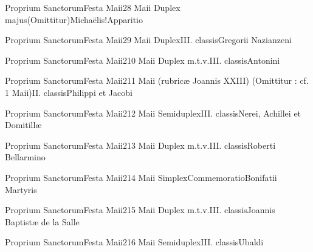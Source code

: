 \documentclass[liber-responsorialis_aestivus.tex]{subfiles}
\begin{document}
	{Proprium Sanctorum}{Festa Maii}{2}{8 Maii}
	{Duplex majus}{(Omittitur)}{Michaëlis!Apparitio}
	{}
	{}

	{Proprium Sanctorum}{Festa Maii}{2}{9 Maii}
	{Duplex}{III. classis}{Gregorii Nazianzeni}
	{\copodorubric}
	{\respdetemp}

	{Proprium Sanctorum}{Festa Maii}{2}{10 Maii}
	{Duplex m.t.v.}{III. classis}{Antonini}
	{\coporubric}
	{\respdetemp}

	{Proprium Sanctorum}{Festa Maii}{2}{11 Maii (rubricæ Joannis XXIII)}
	{(Omittitur : cf. 1 Maii)}{II. classis}{Philippi et Jacobi}
	{}
	{}
\rubric{\aptprubric}

	{Proprium Sanctorum}{Festa Maii}{2}{12 Maii}
	{Semiduplex}{III. classis}{Nerei, Achillei et Domitillæ}
	{\mrtprubric}
	{\respdetemp}

	{Proprium Sanctorum}{Festa Maii}{2}{13 Maii}
	{Duplex m.t.v.}{III. classis}{Roberti Bellarmino}
	{\copodorubric}
	{\respdetemp}

	{Proprium Sanctorum}{Festa Maii}{2}{14 Maii}
	{Simplex}{Commemoratio}{Bonifatii Martyris}
	{}
	{}
\rubric{\respdetemp}

	{Proprium Sanctorum}{Festa Maii}{2}{15 Maii}
	{Duplex m.t.v.}{III. classis}{Joannis Baptistæ de la Salle}
	{\conprubric}
	{\respdetemp}

	{Proprium Sanctorum}{Festa Maii}{2}{16 Maii}
	{Semiduplex}{III. classis}{Ubaldi}
	{\coporubric}
	{\respdetemp}
\end{document}
